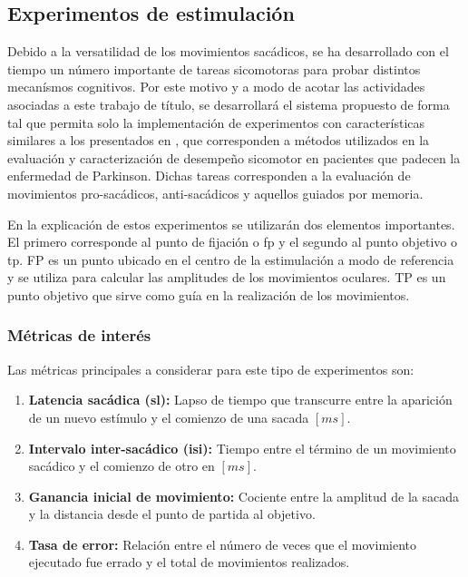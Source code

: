 \documentclass[../main.tex]{subfiles}
\begin{document}
		\vspace{-10mm}
		\subsection{Experimentos de estimulación}
		\label{sub:02_experimentos_de_estimulacion}
			Debido a la versatilidad de los movimientos sacádicos, se ha desarrollado con el tiempo un número importante de tareas sicomotoras para probar distintos mecanísmos cognitivos. Por este motivo y a modo de acotar las actividades asociadas a este trabajo de título, se desarrollará el sistema propuesto de forma tal que permita solo la implementación de experimentos con características similares a los presentados en \cite{article:tests_1, article:tests_2, article:tests_3, article:tests_4, article:tests_5}, que corresponden a métodos utilizados en la evaluación y caracterización de desempeño sicomotor en pacientes que padecen la enfermedad de Parkinson. Dichas tareas corresponden a la evaluación de movimientos pro-sacádicos, anti-sacádicos y aquellos guiados por memoria.

			En la explicación de estos experimentos se utilizarán dos elementos importantes. El primero corresponde al punto de fijación o \acrshort{fp} y el segundo al punto objetivo o \acrshort{tp}. FP es un punto ubicado en el centro de la estimulación a modo de referencia y se utiliza para calcular las amplitudes de los movimientos oculares. TP es un punto objetivo que sirve como guía en la realización de los movimientos. 

			\vspace{-5mm}
			\subsubsection{Métricas de interés}
			\label{ssub:metricas_de_interes}
				Las métricas principales a considerar para este tipo de experimentos son:
				\begin{enumerate}\setlength\itemsep{-0.2em}
				 	\item \textbf{Latencia sacádica (\acrshort{sl}):} Lapso de tiempo que transcurre entre la aparición de un nuevo estímulo y el comienzo de una sacada $[ms]$. 

				 	\item \textbf{Intervalo inter-sacádico (\acrshort{isi}):} Tiempo entre el término de un movimiento sacádico y el comienzo de otro en $[ms]$.
				 	
				 	\item \textbf{Ganancia inicial de movimiento:} Cociente entre la amplitud de la sacada y la distancia desde el punto de partida al objetivo. 
				 	
				 	\item \textbf{Tasa de error:} Relación entre el número de veces que el movimiento ejecutado fue errado y el total de movimientos realizados. 

				 \end{enumerate} 
\end{document}
